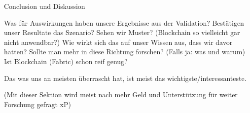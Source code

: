 Conclusion und Diskussion

Was für Auswirkungen haben unsere Ergebnisse aus der Validation?
Bestätigen unser Resultate das Szenario?
Sehen wir Muster? (Blockchain so vielleicht gar nicht anwendbar?)
Wie wirkt sich das auf unser Wissen aus, dass wir davor hatten?
Sollte man mehr in diese Richtung forschen? (Falls ja: was und warum)
Ist Blockchain (Fabric) schon reif genug?

Das was uns an meisten überrascht hat, ist meist das wichtigste/interessanteste.

(Mit dieser Sektion wird meist nach mehr Geld und Unterstützung für weiter Forschung gefragt xP)

